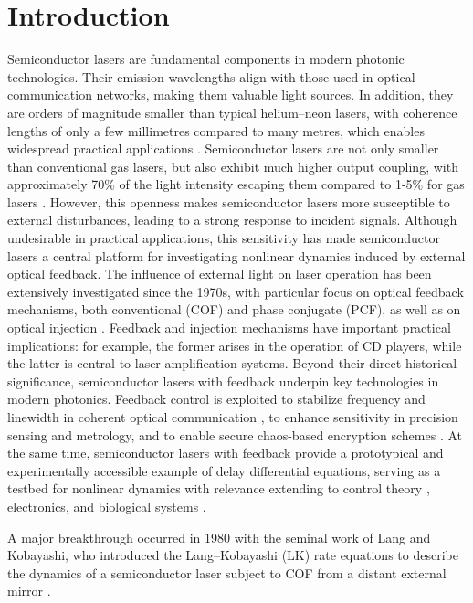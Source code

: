 \section{Introduction}
\label{sec:introduction}
%
Semiconductor lasers are fundamental components in modern photonic technologies.
Their emission wavelengths align with those used in optical communication networks, making them valuable light sources. 
In addition, they are orders of magnitude smaller than typical helium–neon lasers, with coherence lengths of only a few millimetres compared to many metres, which enables widespread practical applications \cite{heiskanen2018photobiomodulation}.
Semiconductor lasers are not only smaller than conventional gas lasers, but also exhibit much higher output coupling, with approximately 70\% of the light intensity escaping them compared to 1-5\% for gas lasers \cite{vantartwijk1995semiconductor}.
However, this openness makes semiconductor lasers more susceptible to external disturbances, leading to a strong response to incident signals.
Although undesirable in practical applications, this sensitivity has made semiconductor lasers a central platform for investigating nonlinear dynamics induced by external optical feedback.
The influence of external light on laser operation has been extensively investigated since the 1970s, with particular focus on optical feedback mechanisms, both conventional (COF) and phase conjugate (PCF), as well as on optical injection \cite{weiss1991dynamics}.
Feedback and injection mechanisms have important practical implications: for example, the former arises in the operation of CD players, while the latter is central to laser amplification systems.
Beyond their direct historical significance, semiconductor lasers with feedback underpin key technologies in modern photonics. 
Feedback control is exploited to stabilize frequency and linewidth in coherent optical communication \cite{tkach2003regimes}, to enhance sensitivity in precision sensing and metrology, and to enable secure chaos-based encryption schemes \cite{uchida2008fast}. 
At the same time, semiconductor lasers with feedback provide a prototypical and experimentally accessible example of delay differential equations, serving as a testbed for nonlinear dynamics with relevance extending to control theory \cite{stepan1989retarded}, electronics, and biological systems \cite{mackey1977oscillation}.
%
\par
%
A major breakthrough occurred in 1980 with the seminal work of Lang and Kobayashi, who introduced the Lang–Kobayashi (LK) rate equations to describe the dynamics of a semiconductor laser subject to COF from a distant external mirror \cite{lang1980external}.
